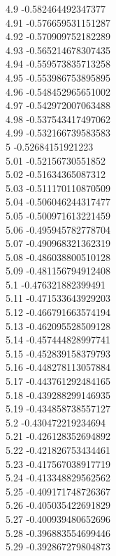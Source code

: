 {4.9	-0.582464492347377\\
4.91	-0.576659531151287\\
4.92	-0.570909752182289\\
4.93	-0.565214678307435\\
4.94	-0.559573835713258\\
4.95	-0.553986753895895\\
4.96	-0.548452965651002\\
4.97	-0.542972007063488\\
4.98	-0.537543417497062\\
4.99	-0.532166739583583\\
5	-0.52684151921223\\
5.01	-0.52156730551852\\
5.02	-0.51634365087312\\
5.03	-0.511170110870509\\
5.04	-0.506046244317477\\
5.05	-0.500971613221459\\
5.06	-0.495945782778704\\
5.07	-0.490968321362319\\
5.08	-0.486038800510128\\
5.09	-0.481156794912408\\
5.1	-0.476321882399491\\
5.11	-0.471533643929203\\
5.12	-0.466791663574194\\
5.13	-0.462095528509128\\
5.14	-0.457444828997741\\
5.15	-0.452839158379793\\
5.16	-0.448278113057884\\
5.17	-0.443761292484165\\
5.18	-0.439288299146935\\
5.19	-0.434858738557127\\
5.2	-0.430472219234694\\
5.21	-0.426128352694892\\
5.22	-0.421826753434461\\
5.23	-0.417567038917719\\
5.24	-0.413348829562562\\
5.25	-0.409171748726367\\
5.26	-0.405035422691829\\
5.27	-0.400939480652696\\
5.28	-0.396883554699446\\
5.29	-0.392867279804873\\
}
